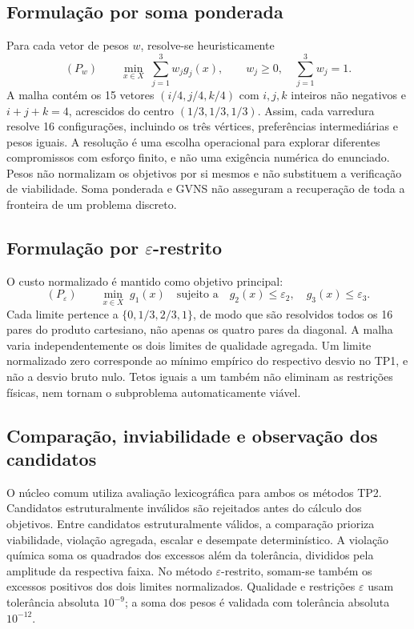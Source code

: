 \subsection{Formulação por soma ponderada}

Para cada vetor de pesos $w$, resolve-se heuristicamente
\begin{equation}
 (P_w)\qquad \min_{x\in X}\;\sum_{j=1}^{3}w_jg_j(x),
 \qquad w_j\geq 0,\quad \sum_{j=1}^{3}w_j=1.
\end{equation}
A malha contém os 15 vetores $(i/4,j/4,k/4)$ com $i,j,k$ inteiros não
negativos e $i+j+k=4$, acrescidos do centro $(1/3,1/3,1/3)$. Assim, cada
varredura resolve 16 configurações, incluindo os três vértices, preferências
intermediárias e pesos iguais. A resolução é uma escolha operacional para
explorar diferentes compromissos com esforço finito, e não uma exigência
numérica do enunciado. Pesos não normalizam os objetivos por si mesmos e não
substituem a verificação de viabilidade. Soma ponderada e GVNS não asseguram
a recuperação de toda a fronteira de um problema discreto.

\subsection{Formulação por $\varepsilon$-restrito}

O custo normalizado é mantido como objetivo principal:
\begin{equation}
 (P_{\varepsilon})\qquad
 \min_{x\in X}\;g_1(x)\quad
 \text{sujeito a}\quad g_2(x)\leq\varepsilon_2,\quad
 g_3(x)\leq\varepsilon_3.
\end{equation}
Cada limite pertence a $\{0,1/3,2/3,1\}$, de modo que são resolvidos todos
os 16 pares do produto cartesiano, não apenas os quatro pares da diagonal.
A malha varia independentemente os dois limites de qualidade agregada.
Um limite normalizado zero corresponde ao mínimo empírico do respectivo
desvio no TP1, e não a desvio bruto nulo. Tetos iguais a um também não
eliminam as restrições físicas, nem tornam o subproblema automaticamente viável.

\subsection{Comparação, inviabilidade e observação dos candidatos}

O núcleo comum utiliza avaliação lexicográfica para ambos os métodos TP2.
Candidatos estruturalmente inválidos são rejeitados antes do cálculo dos
objetivos. Entre candidatos estruturalmente válidos, a comparação prioriza
viabilidade, violação agregada, escalar e desempate determinístico.
A violação química soma os quadrados dos excessos além da tolerância,
divididos pela amplitude da respectiva faixa. No método $\varepsilon$-restrito,
somam-se também os excessos positivos dos dois limites normalizados.
Qualidade e restrições $\varepsilon$ usam tolerância absoluta $10^{-9}$;
a soma dos pesos é validada com tolerância absoluta $10^{-12}$.

